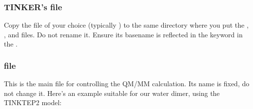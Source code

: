 \documentclass[letterpaper,10pt,english]{sphinxmanual}
\begin{document}
\subsubsection{TINKER’s  file}
\label{\detokenize{tinktep:tinkers-prm-file}}
Copy the  file of your choice (typically ) to
the same directory where you put the , ,  and
 files. Do not rename it. Ensure its basename is
reflected in the  keyword in the .


\subsubsection{ file}
\label{\detokenize{tinktep:tinktep-config-file}}
This is the main file for controlling the QM/MM calculation. Its name is
fixed, do not change it. Here’s an example suitable for our water dimer,
using the TINKTEP2 model:
\end{document}
